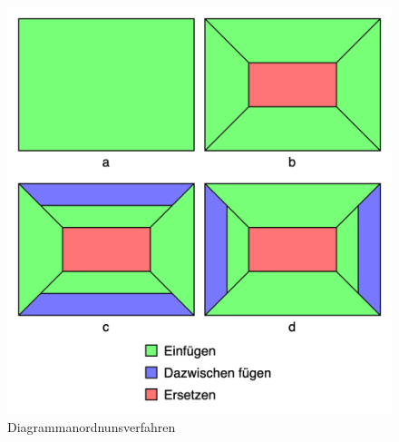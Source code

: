 \begin{figure}
    \begin{center}
    \includegraphics[scale=0.2]{img/abbildungen/DiagrammanordnungsverfahrenMitLegende}
    \end{center}
    \caption{Diagrammanordnunsverfahren}
    \label{figure:diagrammanordnungabbildung}
\end{figure}

